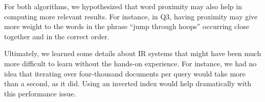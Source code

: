 \documentclass{report}
\begin{document}
For both algorithms, we hypothesized that word proximity may also help
in computing more relevant results. For instance, in Q3, having
proximity may give more weight to the words in the phrase ``jump
through hoops'' occurring close together and in the correct order.

Ultimately, we learned some details about IR systems that might have
been much more difficult to learn without the hands-on experience. For
instance, we had no idea that iterating over four-thousand documents
per query would take more than a second, as it did. Using an inverted
index would help dramatically with this performance issue.
\end{document}
